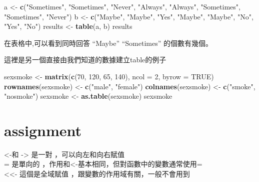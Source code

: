 \documentclass[]{book}
\newenvironment{Shaded}{\begin{snugshade}}{\end{snugshade}}
\newcommand{\DataTypeTok}[1]{\textcolor[rgb]{0.13,0.29,0.53}{#1}}
\newcommand{\DecValTok}[1]{\textcolor[rgb]{0.00,0.00,0.81}{#1}}
\newcommand{\KeywordTok}[1]{\textcolor[rgb]{0.13,0.29,0.53}{\textbf{#1}}}
\newcommand{\NormalTok}[1]{#1}
\newcommand{\OtherTok}[1]{\textcolor[rgb]{0.56,0.35,0.01}{#1}}
\newcommand{\StringTok}[1]{\textcolor[rgb]{0.31,0.60,0.02}{#1}}
\theoremstyle{definition}
\theoremstyle{definition}
\theoremstyle{definition}
\theoremstyle{remark}
\begin{document}
\begin{Shaded}
\begin{Highlighting}[]
\NormalTok{a <-}\StringTok{ }\KeywordTok{c}\NormalTok{(}\StringTok{"Sometimes"}\NormalTok{, }\StringTok{"Sometimes"}\NormalTok{, }\StringTok{"Never"}\NormalTok{, }\StringTok{"Always"}\NormalTok{, }\StringTok{"Always"}\NormalTok{, }\StringTok{"Sometimes"}\NormalTok{, }\StringTok{"Sometimes"}\NormalTok{, }\StringTok{"Never"}\NormalTok{)}
\NormalTok{b <-}\StringTok{ }\KeywordTok{c}\NormalTok{(}\StringTok{"Maybe"}\NormalTok{, }\StringTok{"Maybe"}\NormalTok{, }\StringTok{"Yes"}\NormalTok{, }\StringTok{"Maybe"}\NormalTok{, }\StringTok{"Maybe"}\NormalTok{, }\StringTok{"No"}\NormalTok{, }\StringTok{"Yes"}\NormalTok{, }\StringTok{"No"}\NormalTok{)}
\NormalTok{results <-}\StringTok{ }\KeywordTok{table}\NormalTok{(a, b)}
\NormalTok{results}
\end{Highlighting}
\end{Shaded}

在表格中,可以看到同時回答 ``Maybe'' ``Sometimes'' 的個數有幾個。

這裡是另一個直接由我們知道的數據建立table的例子

\begin{Shaded}
\begin{Highlighting}[]
\NormalTok{sexsmoke <-}\StringTok{ }\KeywordTok{matrix}\NormalTok{(}\KeywordTok{c}\NormalTok{(}\DecValTok{70}\NormalTok{, }\DecValTok{120}\NormalTok{, }\DecValTok{65}\NormalTok{, }\DecValTok{140}\NormalTok{), }\DataTypeTok{ncol =} \DecValTok{2}\NormalTok{, }\DataTypeTok{byrow =} \OtherTok{TRUE}\NormalTok{)}
\KeywordTok{rownames}\NormalTok{(sexsmoke) <-}\StringTok{ }\KeywordTok{c}\NormalTok{(}\StringTok{"male"}\NormalTok{, }\StringTok{"female"}\NormalTok{)}
\KeywordTok{colnames}\NormalTok{(sexsmoke) <-}\StringTok{ }\KeywordTok{c}\NormalTok{(}\StringTok{"smoke"}\NormalTok{, }\StringTok{"nosmoke"}\NormalTok{)}
\NormalTok{sexsmoke <-}\StringTok{ }\KeywordTok{as.table}\NormalTok{(sexsmoke)}
\NormalTok{sexsmoke}
\end{Highlighting}
\end{Shaded}

\hypertarget{assignment}{%
\chapter{assignment}\label{assignment}}

\textless{}-和 -\textgreater{} 是一對 ，可以向左和向右賦值\\
= 是單向的 ，作用和\textless{}-基本相同，但對函數中的變數通常使用=\\
\textless{}\textless{}- 這個是全域賦值
，跟變數的作用域有關，一般不會用到
\end{document}
